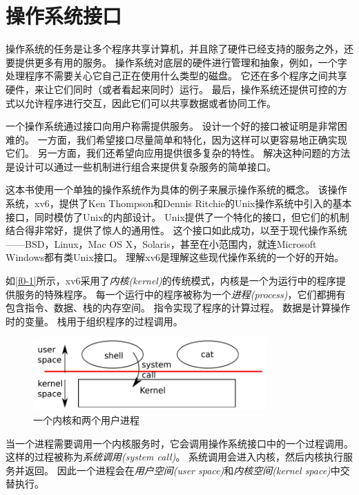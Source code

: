 \chapter{操作系统接口}

操作系统的任务是让多个程序共享计算机，并且除了硬件已经支持的服务之外，还要提供更多有用的服务。
操作系统对底层的硬件进行管理和抽象，例如，一个字处理程序不需要关心它自己正在使用什么类型的磁盘。
它还在多个程序之间共享硬件，来让它们同时（或者看起来同时）运行。
最后，操作系统还提供可控的方式以允许程序进行交互，因此它们可以共享数据或者协同工作。

一个操作系统通过接口向用户称需提供服务。
设计一个好的接口被证明是非常困难的。
一方面，我们希望接口尽量简单和特化，因为这样可以更容易地正确实现它们。
另一方面，我们还希望向应用提供很多复杂的特性。
解决这种问题的方法是设计可以通过一些机制进行组合来提供复杂服务的简单接口。

这本书使用一个单独的操作系统作为具体的例子来展示操作系统的概念。
该操作系统，xv6，提供了Ken Thompson和Dennis Ritchie的Unix操作系统中引入的基本接口，同时模仿了Unix的内部设计。
Unix提供了一个特化的接口，但它们的机制结合得非常好，提供了惊人的通用性。
这个接口如此成功，以至于现代操作系统——BSD，Linux，Mac OS X，Solaris，甚至在小范围内，就连Microsoft Windows都有类Unix接口。
理解xv6是理解这些现代操作系统的一个好的开始。

如\autoref{f0-1}所示，xv6采用了\emph{内核(kernel)}的传统模式，内核是一个为运行中的程序提供服务的特殊程序。
每一个运行中的程序被称为一个\emph{进程(process)}，它们都拥有包含指令、数据、栈的内存空间。
指令实现了程序的计算过程。
数据是计算操作时的变量。
栈用于组织程序的过程调用。

\begin{figure}[htbp]
    \centering
    \includegraphics[width=0.8\textwidth]{../imgs/f0-1.png}
    \caption{一个内核和两个用户进程}
    \label{f0-1}
\end{figure}

当一个进程需要调用一个内核服务时，它会调用操作系统接口中的一个过程调用。
这样的过程被称为\emph{系统调用(system call)}。
系统调用会进入内核，然后内核执行服务并返回。
因此一个进程会在\emph{用户空间(user space)}和\emph{内核空间(kernel space)}中交替执行。

